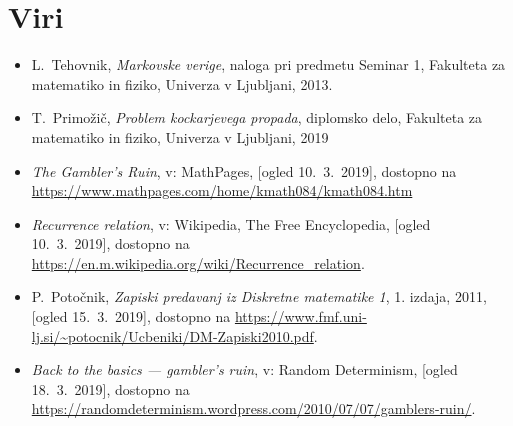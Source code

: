 \documentclass[12pt, a4paper]{article}
\begin{document}
\section[Viri]{Viri}
\begin{itemize}
\item L.~Tehovnik, \emph{Markovske verige}, naloga pri predmetu Seminar 1, Fakulteta za matematiko in fiziko, Univerza v Ljubljani, 2013.
\item T.~Primožič, \emph{Problem kockarjevega propada}, diplomsko delo, Fakulteta za matematiko in fiziko, Univerza v Ljubljani, 2019
\item \emph{The Gambler's Ruin}, v: MathPages, [ogled 10.~3.~2019], dostopno na \url{https://www.mathpages.com/home/kmath084/kmath084.htm}
\item \emph{Recurrence relation}, v: Wikipedia, The Free Encyclopedia, [ogled 10.~3.~2019], dostopno na \url{https://en.m.wikipedia.org/wiki/Recurrence_relation}.
\item P.~Potočnik, \emph{Zapiski predavanj iz Diskretne matematike 1}, 1. izdaja, 2011, [ogled 15.~3.~2019], dostopno na \url{https://www.fmf.uni-lj.si/~potocnik/Ucbeniki/DM-Zapiski2010.pdf}.
\item \emph{Back to the basics — gambler’s ruin}, v: Random Determinism, [ogled 18.~3.~2019], dostopno na \url{https://randomdeterminism.wordpress.com/2010/07/07/gamblers-ruin/}.
\end{itemize}
\end{document}
